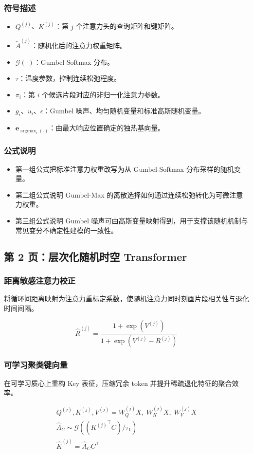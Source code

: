 ﻿\documentclass[UTF8,a4paper,10pt]{ctexart}
\begin{document}
\subsubsection*{符号描述}
\begin{itemize}
  \item $Q^{(j)}$、$K^{(j)}$：第 $j$ 个注意力头的查询矩阵和键矩阵。
  \item $\tilde A^{(j)}$：随机化后的注意力权重矩阵。
  \item $\mathcal{G}(\cdot)$：Gumbel-Softmax 分布。
  \item $\tau$：温度参数，控制连续松弛程度。
  \item $\pi_i$：第 $i$ 个候选片段对应的非归一化注意力参数。
  \item $g_i$、$u_i$、$\epsilon$：Gumbel 噪声、均匀随机变量和标准高斯随机变量。
  \item $\bm e_{\operatorname{argmax}_i(\cdot)}$：由最大响应位置确定的独热基向量。
\end{itemize}
\subsubsection*{公式说明}
\begin{itemize}
  \item 第一组公式把标准注意力权重改写为从 Gumbel-Softmax 分布采样的随机变量。
  \item 第二组公式说明 Gumbel-Max 的离散选择如何通过连续松弛转化为可微注意力权重。
  \item 第三组公式说明 Gumbel 噪声可由高斯变量映射得到，用于支撑该随机机制与常见变分不确定性建模的一致性。
\end{itemize}

\clearpage
\subsection{第 2 页：层次化随机时空 Transformer}

\subsubsection*{距离敏感注意力校正}
将循环间距离映射为注意力重标定系数，使随机注意力同时刻画片段相关性与退化时间间隔。
\begin{formulabox}
\[
  \hat{R}^{(j)}
  = \frac{1+\exp(V^{(j)})}{1+\exp(V^{(j)}-R^{(j)})}
\]
\end{formulabox}

\subsubsection*{可学习聚类键向量}
在可学习质心上重构 Key 表征，压缩冗余 token 并提升稀疏退化特征的聚合效率。
\begin{formulabox}
\[\begin{gathered}
  Q^{(j)},K^{(j)},V^{(j)}
  = W_Q^{(j)}X,\;W_K^{(j)}X,\;W_V^{(j)}X \\
  \hat{A}_{C}
  \sim \mathcal{G}\left(({K^{(j)}}^\top C)/\tau_1\right) \\
  \hat{K}^{(j)}
  = \hat{A}_{C}C^\top 
\end{gathered}\]
\end{formulabox}
\end{document}
